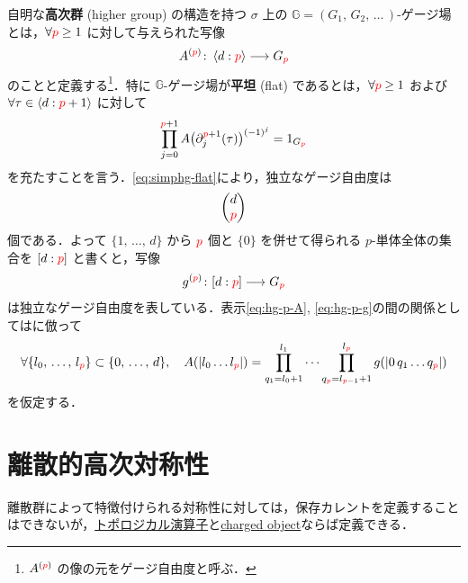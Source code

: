 \documentclass[TQFT_main]{subfiles}
\begin{document}
自明な\textbf{高次群} (higher group) の構造を持つ $\sigma$ 上の $\mathbb{G} = (G_1,\, G_2,\, \dots\, )$-ゲージ場とは，$\forall \textcolor{red}{p} \ge 1$ に対して与えられた写像
\begin{align}
    \label{eq:hg-p-A}
    A^{(\textcolor{red}{p})} \colon \expval{d:\textcolor{red}{p}} \longrightarrow G_{\textcolor{red}{p}}
\end{align}
のことと定義する\footnote{$A^{(\textcolor{red}{p})}$ の像の元をゲージ自由度と呼ぶ．}．特に $\mathbb{G}$-ゲージ場が\textbf{平坦} (flat) であるとは，$\forall \textcolor{red}{p} \ge 1$ および $\forall \tau \in \expval{d:\textcolor{red}{p}+1}$ に対して
\begin{align}
    \label{eq:simphg-flat}
    \prod_{j=0}^{\textcolor{red}{p}+1} A\bigl(\partial_j^{\textcolor{red}{p}+1}(\tau)\bigr)^{(-1)^j} = 1_{G_{\textcolor{red}{p}}}
\end{align}
を充たすことを言う．\eqref{eq:simphg-flat}により，独立なゲージ自由度は
\begin{align}
    \mqty(d \\ \textcolor{red}{p})
\end{align}
個である．よって $\{1,\, \dots,\, d\}$ から $\textcolor{red}{p}$ 個と $\{0\}$ を併せて得られる $p$-単体全体の集合を $[d:\textcolor{red}{p}]$ と書くと，写像
\begin{align}
    \label{eq:hg-p-g}
    g^{(\textcolor{red}{p})} \colon [d:\textcolor{red}{p}] \longrightarrow G_{\textcolor{red}{p}}
\end{align}
は独立なゲージ自由度を表している．表示\eqref{eq:hg-p-A}, \eqref{eq:hg-p-g}の間の関係としては\cite[p.8]{SChen2024anomaly}に倣って
\begin{align}
    \label{eq:hg-ansatz}
    \forall \{l_0,\, \dots,\, l_{\textcolor{red}{p}}\} \subset \{0,\, \dots,\, d\}, \quad
    A(\abs{l_0 \dots l_{\textcolor{red}{p}}}) = \prod_{q_1 = l_0+1}^{l_1} \cdots \prod_{q_{\textcolor{red}{p}} = l_{\textcolor{red}{p} - 1} + 1}^{l_{\textcolor{red}{p}}} g(\abs{0\, q_1 \dots q_{\textcolor{red}{p}}})
\end{align}
を仮定する．


\section{離散的高次対称性}

離散群によって特徴付けられる対称性に対しては，保存カレントを定義することはできないが，\hyperref[def:p-form-sym]{トポロジカル演算子}と\hyperref[def:p-form-sym]{charged object}ならば定義できる．
\end{document}
